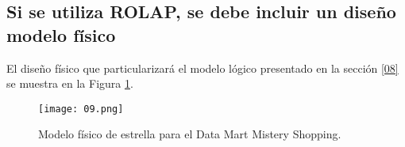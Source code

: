 \medskip
\subsection{Si se utiliza ROLAP, se debe incluir un diseño modelo físico}
\label{09}
El diseño físico que particularizará el modelo lógico presentado en la sección \ref{08} se muestra en la Figura \ref{09-image}.
\begin{figure}[!th]
\texttt{[image: 09.png]}
\centering
\caption{Modelo físico de estrella para el Data Mart Mistery Shopping.}
\label{09-image}
\end{figure}
